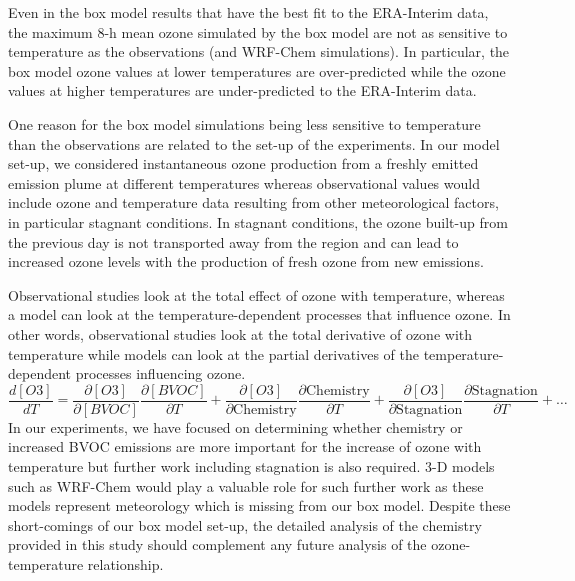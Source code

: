 Even in the box model results that have the best fit to the ERA-Interim data, the maximum 8-h mean ozone simulated by the box model are not as sensitive to temperature as the observations (and WRF-Chem simulations).
In particular, the box model ozone values at lower temperatures are over-predicted while the ozone values at higher temperatures are under-predicted to the ERA-Interim data.

One reason for the box model simulations being less sensitive to temperature than the observations are related to the set-up of the experiments.
In our model set-up, we considered instantaneous ozone production from a freshly emitted emission plume at different temperatures whereas observational values would include ozone and temperature data resulting from other meteorological factors, in particular stagnant conditions.
In stagnant conditions, the ozone built-up from the previous day is not transported away from the region and can lead to increased ozone levels with the production of fresh ozone from new emissions.

Observational studies look at the total effect of ozone with temperature, whereas a model can look at the temperature-dependent processes that influence ozone. 
In other words, observational studies look at the total derivative of ozone with temperature while models can look at the partial derivatives of the temperature-dependent processes influencing ozone. 
\begin{equation*} 
    \frac{d[O3]}{dT} = \frac{\partial [O3]}{\partial [BVOC]}\frac{\partial [BVOC]}{\partial T} + \frac{\partial [O3]}{\partial \text{Chemistry}}\frac{\partial \text{Chemistry}}{\partial T} + \frac{\partial [O3]}{\partial \text{Stagnation}}\frac{\partial \text{Stagnation}}{\partial T} + \dots
\end{equation*}
In our experiments, we have focused on determining whether chemistry or increased BVOC emissions are more important for the increase of ozone with temperature but further work including stagnation is also required. 
3-D models such as WRF-Chem would play a valuable role for such further work as these models represent meteorology which is missing from our box model.
Despite these short-comings of our box model set-up, the detailed analysis of the chemistry provided in this study should complement any future analysis of the ozone-temperature relationship.
